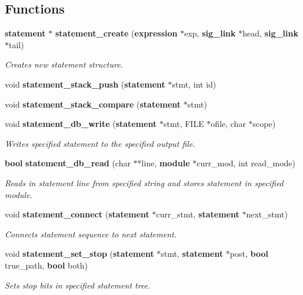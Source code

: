 \subsection*{Functions}
\begin{CompactItemize}
\item 
{\bf statement} $\ast$ {\bf statement\_\-create} ({\bf expression} $\ast$exp, {\bf sig\_\-link} $\ast$head, {\bf sig\_\-link} $\ast$tail)
\begin{CompactList}\small\item\em Creates new statement structure. \item\end{CompactList}\item 
void {\bf statement\_\-stack\_\-push} ({\bf statement} $\ast$stmt, int id)
\item 
void {\bf statement\_\-stack\_\-compare} ({\bf statement} $\ast$stmt)
\item 
void {\bf statement\_\-db\_\-write} ({\bf statement} $\ast$stmt, FILE $\ast$ofile, char $\ast$scope)
\begin{CompactList}\small\item\em Writes specified statement to the specified output file. \item\end{CompactList}\item 
{\bf bool} {\bf statement\_\-db\_\-read} (char $\ast$$\ast$line, {\bf module} $\ast$curr\_\-mod, int read\_\-mode)
\begin{CompactList}\small\item\em Reads in statement line from specified string and stores statement in specified module. \item\end{CompactList}\item 
void {\bf statement\_\-connect} ({\bf statement} $\ast$curr\_\-stmt, {\bf statement} $\ast$next\_\-stmt)
\begin{CompactList}\small\item\em Connects statement sequence to next statement. \item\end{CompactList}\item 
void {\bf statement\_\-set\_\-stop} ({\bf statement} $\ast$stmt, {\bf statement} $\ast$post, {\bf bool} true\_\-path, {\bf bool} both)
\begin{CompactList}\small\item\em Sets stop bits in specified statement tree. \item\end{CompactList}\item 
$$
\end{CompactItemize}
